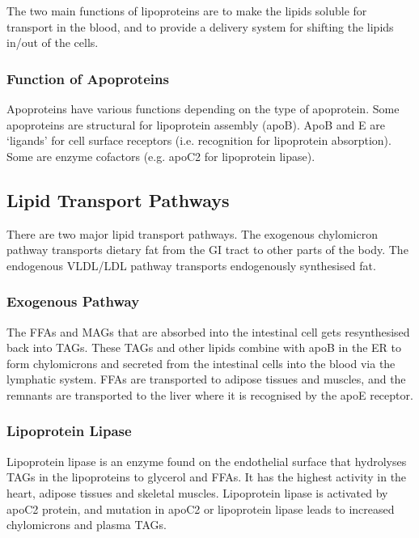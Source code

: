The two main functions of lipoproteins are to make the lipids soluble for transport in the blood, and to provide a delivery system for shifting the lipids in/out of the cells.

\subsubsection{Function of Apoproteins}

Apoproteins have various functions depending on the type of apoprotein.
Some apoproteins are structural for lipoprotein assembly (apoB).
ApoB and E are `ligands' for cell surface receptors (i.e. recognition for lipoprotein absorption).
Some are enzyme cofactors (e.g. apoC2 for lipoprotein lipase).

\subsection{Lipid Transport Pathways}

There  are two major lipid transport pathways.
The exogenous chylomicron pathway transports dietary fat from the GI tract to other parts of the body.
The endogenous VLDL/LDL pathway transports endogenously synthesised fat.

\begin{center}
\end{center}

\subsubsection{Exogenous Pathway}

The FFAs and MAGs that are absorbed into the intestinal cell gets resynthesised back into TAGs.
These TAGs and other lipids combine with apoB in the ER to form chylomicrons and secreted from the intestinal cells into the blood via the lymphatic system.
FFAs are transported to adipose tissues and muscles, and the remnants are transported to the liver where it is recognised by the apoE receptor.

\subsubsection{Lipoprotein Lipase}

Lipoprotein lipase is an enzyme found on the endothelial surface that hydrolyses TAGs in the lipoproteins to glycerol and FFAs.
It has the highest activity in the heart, adipose tissues and skeletal muscles.
Lipoprotein lipase is activated by apoC2 protein, and mutation in apoC2 or lipoprotein lipase leads to increased chylomicrons and plasma TAGs.

